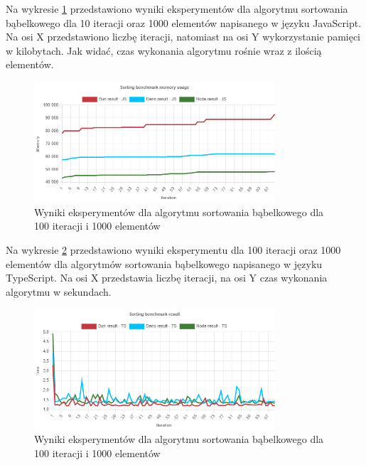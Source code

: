 Na wykresie \ref{fig:bubble_sorting_e2_memory_js} przedstawiono wyniki eksperymentów dla algorytmu sortowania bąbelkowego dla 10 iteracji oraz 1000 elementów napisanego w języku JavaScript. Na osi X przedstawiono liczbę iteracji, natomiast na osi Y wykorzystanie pamięci w kilobytach. Jak widać, czas wykonania algorytmu rośnie wraz z ilością elementów.
\begin{figure}[H]
  \centering
  \includegraphics[width=0.8\textwidth]{Figures/sorting/bubble/e2_memory_js.png}
  \caption{Wyniki eksperymentów dla algorytmu sortowania bąbelkowego dla 100 iteracji i 1000 elementów}
  \label{fig:bubble_sorting_e2_memory_js}
\end{figure}

Na wykresie \ref{fig:bubble_sorting_e2_ts} przedstawiono wyniki eksperymentu dla 100 iteracji oraz 1000 elementów dla algorytmów sortowania bąbelkowego napisanego w języku TypeScript. Na osi X przedstawia liczbę iteracji, na osi Y czas wykonania algorytmu w sekundach. 

\begin{figure}[H]
  \centering
  \includegraphics[width=0.8\textwidth]{Figures/sorting/bubble/e2_ts.png}
  \caption{Wyniki eksperymentów dla algorytmu sortowania bąbelkowego dla 100 iteracji i 1000 elementów}
  \label{fig:bubble_sorting_e2_ts}
\end{figure}

